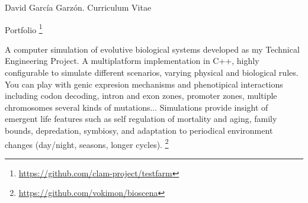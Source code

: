 \documentclass{article}
\begin{document}
\begin{cv}{David García Garzón. Curriculum Vitae}
\begin{cvlist}{Portfolio}
\footnote{\href{https://github.com/clam-project/testfarm}{https://github.com/clam-project/testfarm}}
\item[Bioscena]
A computer simulation of evolutive biological systems developed as my Technical Engineering Project. A multiplatform implementation in C++, highly configurable to simulate different scenarios, varying physical and biological rules. You can play with genic expresion mechanisms and phenotipical interactions including codon decoding, intron and exon zones, promoter zones, multiple chromosomes several kinds of mutations... Simulations provide insight of emergent life features such as self regulation of mortality and aging, family bounds, depredation, symbiosy, and adaptation to periodical environment changes (day/night, seasons, longer cycles).
\footnote{\href{https://github.com/vokimon/bioscena}{https://github.com/vokimon/bioscena}}

\end{cvlist}


\vspace{2cm}

\end{cv}
\end{document}
